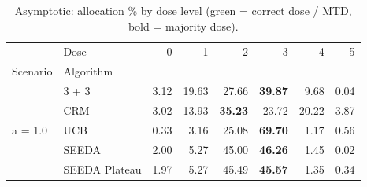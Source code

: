 \begin{table}[H]
\centering
\caption{Asymptotic: allocation \% by dose level (green = correct dose / MTD, bold = majority dose).}
\label{tab:asym_alloc_by_dose}
\begin{tabular}{llrrrrrr}
\toprule
 & Dose & 0 & 1 & 2 & 3 & 4 & 5 \\
Scenario & Algorithm &  &  &  &  &  &  \\
\midrule
\multirow[c]{5}{*}{a = 1.0} & 3 + 3 & 3.12 & 19.63 & {\cellcolor[HTML]{C8E6C9}} 27.66 & \bfseries 39.87 & 9.68 & 0.04 \\
 & CRM & 3.02 & 13.93 & {\cellcolor[HTML]{C8E6C9}} \bfseries 35.23 & 23.72 & 20.22 & 3.87 \\
 & UCB & 0.33 & 3.16 & {\cellcolor[HTML]{C8E6C9}} 25.08 & \bfseries 69.70 & 1.17 & 0.56 \\
 & SEEDA & 2.00 & 5.27 & {\cellcolor[HTML]{C8E6C9}} 45.00 & \bfseries 46.26 & 1.45 & 0.02 \\
 & SEEDA Plateau & 1.97 & 5.27 & {\cellcolor[HTML]{C8E6C9}} 45.49 & \bfseries 45.57 & 1.35 & 0.34 \\
\bottomrule
\end{tabular}
\end{table}
